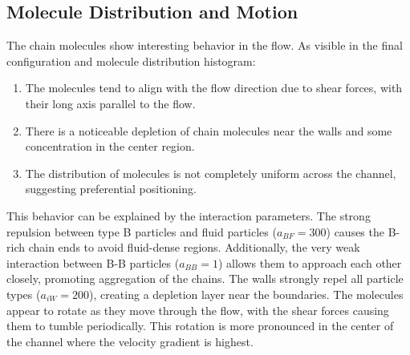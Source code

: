 \subsection{Molecule Distribution and Motion}
The chain molecules show interesting behavior in the flow. As visible in the final configuration and molecule distribution histogram:
\begin{enumerate}
	\item The molecules tend to align with the flow direction due to shear forces, with their long axis parallel to the flow.
	\item There is a noticeable depletion of chain molecules near the walls and some concentration in the center region.
	\item The distribution of molecules is not completely uniform across the channel, suggesting preferential positioning.
\end{enumerate}
This behavior can be explained by the interaction parameters. The strong repulsion between type B particles and fluid particles ($a_{BF} = 300$) causes the B-rich chain ends to avoid fluid-dense regions. Additionally, the very weak interaction between B-B particles ($a_{BB} = 1$) allows them to approach each other closely, promoting aggregation of the chains. The walls strongly repel all particle types ($a_{iW} = 200$), creating a depletion layer near the boundaries.
The molecules appear to rotate as they move through the flow, with the shear forces causing them to tumble periodically. This rotation is more pronounced in the center of the channel where the velocity gradient is highest.

